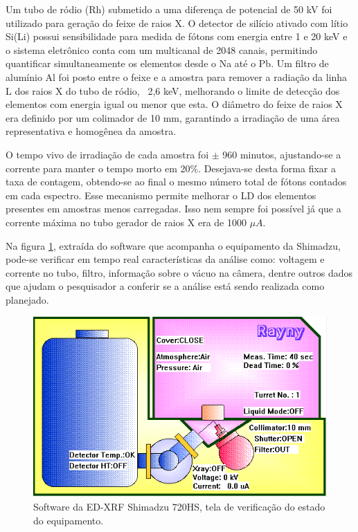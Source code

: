 Um tubo de ródio (Rh) submetido a uma diferença de potencial 
de 50 kV foi utilizado para geração do feixe de raios X.
O detector de silício ativado com lítio Si(Li) possui sensibilidade
para medida de fótons com energia entre 1 e 20 keV e o sistema eletrônico 
conta com um multicanal de 2048 canais, permitindo quantificar simultaneamente 
os elementos desde o Na até o Pb.
Um filtro de alumínio Al foi posto entre o feixe e a amostra para remover
a radiação da linha L dos raios X do tubo de ródio, ~2,6 keV, melhorando o 
limite de detecção dos elementos com energia igual ou menor que esta. 
O diâmetro do feixe de raios X era definido por um colimador de 10 mm, 
garantindo a irradiação de uma área representativa e homogênea da amostra. 

O tempo vivo de irradiação de cada amostra foi $\pm$ 960 minutos, ajustando-se 
a corrente para manter o tempo morto em 20\%. Desejava-se desta forma fixar a 
taxa de contagem, obtendo-se ao final o mesmo número total de fótons contados 
em cada espectro. Esse mecanismo permite melhorar o LD dos elementos presentes 
em amostras menos carregadas. Isso nem sempre foi possível já que a corrente 
máxima no tubo gerador de raios X era de 1000 $\mu A$. 

Na figura \ref{fig:xrfed_software}, extraída do software que acompanha o 
equipamento da Shimadzu, pode-se verificar em tempo real características da
análise como:  voltagem e corrente no tubo, filtro, informação sobre o vácuo na
câmera, dentre outros dados que ajudam o pesquisador a conferir se 
a análise está sendo realizada como planejado. 

\begin{figure}[H]
  \centering
  \includegraphics[scale=0.4]{../inputs/images/edx_iag_monitor.png}
  \caption{Software da ED-XRF Shimadzu 720HS, tela de verificação 
           do estado do equipamento. \label{fig:xrfed_software}}
\end{figure}

